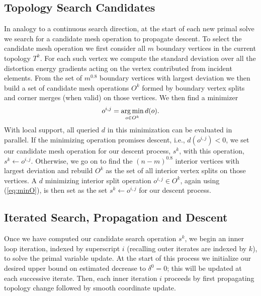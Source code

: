 \subsection{Topology Search Candidates}
\label{sec:descent_op}
In analogy to a continuous search direction, at the start of each new primal solve we search for a candidate mesh operation to propagate descent. 
%
To select the candidate mesh operation we first consider all $m$ boundary vertices in the current topology $T^k$.  For each such vertex we compute the standard deviation over all the distortion energy gradients acting on the vertex contributed from incident elements. From the set of $m^{0.8}$ boundary vertices with largest deviation we then build a set of candidate mesh operations $O^k$ formed by boundary vertex splits and corner merges (when valid) on those vertices.  We then find a minimizer
\begin{align}
\label{eq:minO}
o^{i,j} = \operatorname*{arg\,min}_{o \in O^k} d(o).
\end{align}
With local support, all queried $d$ in this minimization can be evaluated in parallel. If the minimizing operation promises descent, i.e., $d(o^{i,j}) < 0$, we set our candidate mesh operation for our descent process, $s^k$, with this operation, $s^k \leftarrow o^{i,j}$. Otherwise, we go on to find the $(n-m)^{0.8}$ interior vertices with largest deviation and rebuild $O^k$ as the set of all interior vertex splits on those vertices. A $d$ minimizing interior split operation $o^{i,j} \in O^k$, again using (\ref{eq:minO}), is then set as the set $s^k \leftarrow o^{i,j}$ for our descent process.

\subsection{Iterated Search, Propagation and Descent}

Once we have computed our candidate search operation $s^k$, we begin an inner loop iteration, indexed by superscript $i$ (recalling outer iterates are indexed by $k$), to solve the primal variable update. At the start of this process we initialize our desired upper bound on estimated decrease to $\delta^0 = 0$; this will be updated at each successive iterate. Then, each inner iteration $i$ proceeds by first propagating topology change followed by smooth coordinate update. 

